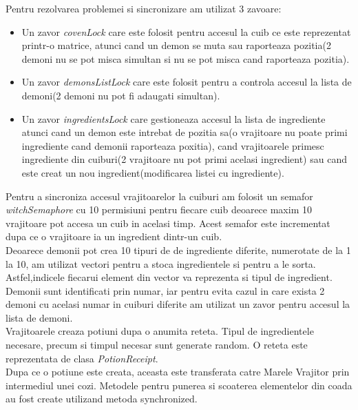 \documentclass{article}
\begin{document}
       
      Pentru rezolvarea problemei si sincronizare am utilizat 3 zavoare:
            \begin{itemize}
                \item Un zavor \textit{covenLock} care este folosit pentru accesul la cuib ce este reprezentat printr-o matrice, atunci cand un demon se muta sau raporteaza pozitia(2 demoni nu se pot misca simultan si nu se pot misca cand raporteaza pozitia).
                \item Un zavor \textit{demonsListLock} care este folosit pentru a controla accesul la lista de demoni(2 demoni nu pot fi adaugati simultan).
                \item Un zavor \textit{ingredientsLock} care gestioneaza accesul la lista de ingrediente atunci cand un demon este intrebat de pozitia sa(o vrajitoare nu poate primi ingrediente cand demonii raporteaza poxitia), cand vrajitoarele primesc ingrediente din cuiburi(2 vrajitoare nu pot primi acelasi ingredient) sau  cand este creat un nou ingredient(modificarea listei cu ingrediente).
            \end{itemize}
        
        Pentru a sincroniza accesul vrajitoarelor la cuiburi am folosit un semafor \textit{witchSemaphore} cu 10 permisiuni pentru fiecare cuib deoarece maxim 10 vrajitoare pot accesa un cuib in acelasi timp. Acest semafor este incrementat dupa ce o vrajitoare ia un ingredient dintr-un cuib.
        \\
        
        Deoarece demonii pot crea 10 tipuri de de ingrediente diferite, numerotate de la 1 la 10, am utilizat vectori pentru a stoca ingredientele si pentru a le sorta. Astfel,indicele fiecarui element din vector va reprezenta si tipul de ingredient.
        \\
        
        Demonii sunt identificati prin numar, iar pentru evita cazul in care exista 2 demoni cu acelasi numar in cuiburi diferite am utilizat un zavor pentru accesul la lista de demoni.
        \\
        
        Vrajitoarele creaza potiuni dupa o anumita reteta. Tipul de ingredientele necesare, precum si timpul necesar sunt generate random. O reteta este reprezentata de clasa \textit{PotionReceipt}. 
        \\
        
        Dupa ce o potiune este creata, aceasta este transferata catre Marele Vrajitor prin intermediul unei cozi. Metodele pentru punerea si scoaterea elementelor din coada au fost create utilizand metoda synchronized.
        \\
        \\
\end{document}
